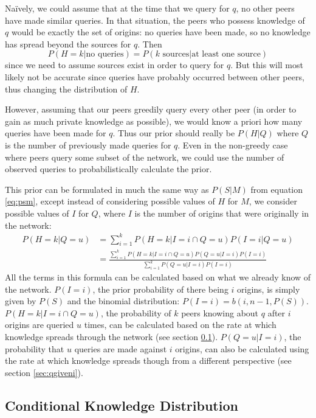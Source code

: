 \documentclass{article}
\newcommand{\eqnref}[1]{equation \eqref{eq:#1}}
\newcommand{\secref}[1]{section \ref{sec:#1}}
\begin{document}
Na\"ively, we could assume that at the time that we query for $q$, no other
peers have made similar queries. In that situation, the peers who
possess knowledge of $q$ would be exactly the set of origins: no queries have
been made, so no knowledge has spread beyond the sources for $q$. Then
\begin{equation*}
	P(H=k|\text{no queries})=P(k\text{ sources}|\text{at least one
	source})
\end{equation*}
since we need to assume sources exist in order to query for $q$. But this will
most likely not be accurate since queries have probably occurred between other
peers, thus changing the distribution of $H$.

However, assuming that our peers greedily query every other peer
(in order to gain as much private knowledge as possible), we would know a priori
how many queries have been made for $q$. Thus our prior should really be
$P(H|Q)$ where $Q$ is the number of previously made queries for $q$. Even in the
non-greedy case where peers query some subset of the network, we could use the
number of observed queries to probabilistically calculate the prior.


This prior can be formulated in much the same way as $P(S|M)$ from \eqnref{psm},
except instead of considering possible values of $H$ for $M$, we consider possible
values of $I$ for $Q$, where $I$ is the number of origins that were originally in the network:
\begin{align}
	P(H=k|Q=u)&=\sum_{i=1}^kP(H=k|I=i\cap Q=u)P(I=i|Q=u)\nonumber\\
	&=\frac{\sum_{i=1}^kP(H=k|I=i\cap
	Q=u)P(Q=u|I=i)P(I=i)}{\sum_{i=1}^{k}P(Q=u|I=i)P(I=i)}\label{eq:hgq}
\end{align}
All the terms in this formula can be calculated based on what we already know of
the network. $P(I=i)$, the prior probability of
there being $i$ origins, is simply given by $P(S)$ and the binomial
distribution: $P(I=i)=b(i,n-1,P(S))$. $P(H=k|I=i\cap Q=u)$, the probability of
$k$ peers knowing about $q$ after $i$ origins are queried $u$ times, can
be calculated based on the rate at which knowledge spreads through the network
(see \secref{hgiveniq}). $P(Q=u|I=i)$, the probability that $u$ queries are made
against $i$ origins, can also be calculated using the rate at which
knowledge spreads though from a different perspective (see \secref{qgiveni}).

\subsection{Conditional Knowledge Distribution}\label{sec:hgiveniq}
\end{document}
